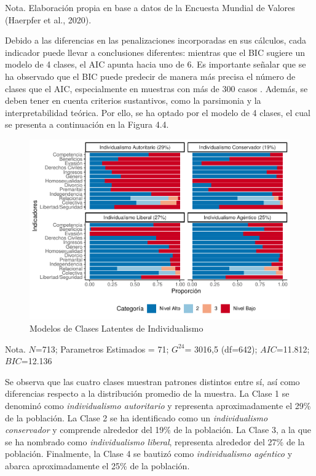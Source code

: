 \documentclass[12pt,twoside]{templates/facsothesis}
\begin{document}
Nota. Elaboración propia en base a datos de la Encuesta Mundial de Valores (Haerpfer et al., 2020).

Debido a las diferencias en las penalizaciones incorporadas en sus cálculos, cada indicador puede llevar a conclusiones diferentes: mientras que el BIC sugiere un modelo de 4 clases, el AIC apunta hacia uno de 6. Es importante señalar que se ha observado que el BIC puede predecir de manera más precisa el número de clases que el AIC, especialmente en muestras con más de 300 casos \citep{nylund2007}. Además, se deben tener en cuenta criterios sustantivos, como la parsimonia y la interpretabilidad teórica. Por ello, se ha optado por el modelo de 4 clases, el cual se presenta a continuación en la Figura 4.4.

\begin{figure}[!ht]

{\centering \includegraphics[width=0.8\linewidth,]{tesis_files/figure-latex/unnamed-chunk-12-1} 

}

\caption{Modelos de Clases Latentes de Individualismo}\label{fig:unnamed-chunk-12}
\end{figure}
\FloatBarrier

Nota. \(N\)=713; Parametros Estimados = 71; \(G^24\)= 3016,5 (df=642); \(AIC\)=11.812; \(BIC\)=12.136

Se observa que las cuatro clases muestran patrones distintos entre sí, así como diferencias respecto a la distribución promedio de la muestra. La Clase 1 se denominó como \emph{individualismo autoritario} y representa aproximadamente el 29\% de la población. La Clase 2 se ha identificado como un \emph{individualismo conservador} y comprende alrededor del 19\% de la población. La Clase 3, a la que se ha nombrado como \emph{individualismo liberal}, representa alrededor del 27\% de la población. Finalmente, la Clase 4 se bautizó como \emph{individualismo agéntico} y abarca aproximadamente el 25\% de la población.
\end{document}
